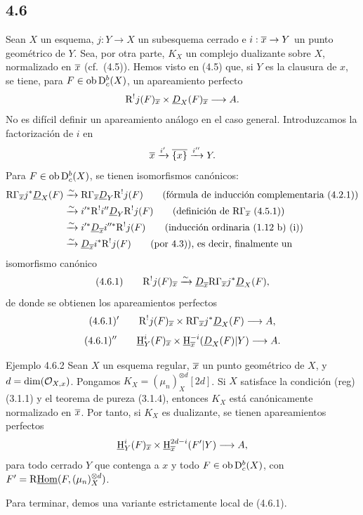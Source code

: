\subsection*{4.6}
Sean $X$ un esquema, $j:Y\to X$ un subesquema cerrado e $i:\overline{x}\to Y$ un punto geométrico de $Y$. Sea, por otra parte, $K_X$ un complejo dualizante sobre $X$, normalizado en $\overline{x}$ (cf.~(4.5)). Hemos visto en (4.5) que, si $Y$ es la clausura de $x$, se tiene, para $F\in\operatorname{ob}\mathrm{D}_c^b(X)$, un apareamiento perfecto
\[
\mathrm{R}^{!}j(F)_{\overline{x}}\times \underline{D}_X(F)_{\overline{x}}\longrightarrow A.
\]
No es difícil definir un apareamiento análogo en el caso general. Introduzcamos la factorización de $i$ en
\[
\overline{x}\xrightarrow{i'}\overline{\{x\}}\xrightarrow{i''}Y.
\]
Para $F\in\operatorname{ob}\mathrm{D}_c^b(X)$, se tienen isomorfismos canónicos:
\[
\begin{aligned}
\mathrm{R}\Gamma_{\overline{x}}j^*\underline{D}_X(F)&\xrightarrow{\sim}\mathrm{R}\Gamma_{\overline{x}}\underline{D}_Y\mathrm{R}^{!}j(F)\qquad\text{(fórmula de inducción complementaria (4.2.1))}\\
&\xrightarrow{\sim}i'^*\mathrm{R}^{!}i''\underline{D}_Y\mathrm{R}^{!}j(F)\qquad\text{(definición de $\mathrm{R}\Gamma_{\overline{x}}$ (4.5.1))}\\
&\xrightarrow{\sim}i'^*\underline{D}_{\overline{x}}i''^*\mathrm{R}^{!}j(F)\qquad\text{(inducción ordinaria (1.12 b) (i))}\\
&\xrightarrow{\sim}\underline{D}_{\overline{x}}i^*\mathrm{R}^{!}j(F)\qquad\text{(por 4.3)), es decir, finalmente un}
\end{aligned}
\]
isomorfismo canónico
\[
(4.6.1)\qquad \mathrm{R}^{!}j(F)_{\overline{x}}\xrightarrow{\sim}\underline{D}_{\overline{x}}\mathrm{R}\Gamma_{\overline{x}}j^*\underline{D}_X(F),
\]
de donde se obtienen los apareamientos perfectos
\[
(4.6.1)'\qquad \mathrm{R}^{!}j(F)_{\overline{x}}\times \mathrm{R}\Gamma_{\overline{x}}j^*\underline{D}_X(F)\longrightarrow A,
\]
\[
(4.6.1)''\qquad \underline{\mathrm H}_Y^i(F)_{\overline{x}}\times \underline{\mathrm H}_{\overline{x}}^{-i}(\underline{D}_X(F)|Y)\longrightarrow A.
\]

\begin{statement}{Ejemplo 4.6.2}
Sean $X$ un esquema regular, $\overline{x}$ un punto geométrico de $X$, y $d=\dim(\mathcal{O}_{X,x})$. Pongamos $K_X=(\mu_n)_X^{\otimes d}[2d]$. Si $X$ satisface la condición (reg) (3.1.1) y el teorema de pureza (3.1.4), entonces $K_X$ está canónicamente normalizado en $\overline{x}$. Por tanto, si $K_X$ es dualizante, se tienen apareamientos perfectos
\[
\underline{\mathrm H}_Y^i(F)_{\overline{x}}\times \underline{\mathrm H}_{\overline{x}}^{2d-i}(F'|Y)\longrightarrow A,
\]
para todo cerrado $Y$ que contenga a $x$ y todo $F\in\operatorname{ob}\mathrm{D}_c^b(X)$, con $F'=\mathrm{R}\underline{\operatorname{Hom}}(F,(\mu_n)_X^{\otimes d})$.
\end{statement}

Para terminar, demos una variante estrictamente local de (4.6.1).
